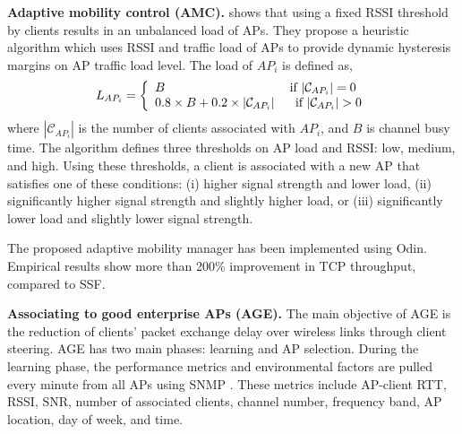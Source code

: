 \textbf{Adaptive mobility control (AMC).} 
\cite{mob-Essex-2016} shows that using a fixed RSSI threshold by clients results in an unbalanced load of APs.
They propose a heuristic algorithm which uses RSSI and traffic load of APs to provide dynamic hysteresis margins on AP traffic load level. 
The load of $AP_{i}$ is defined as,
%
\begin{equation}
\label{eq:eq18}
L_{AP_{i}}=\left\{\begin{array}{ll}
B\textrm{\ \ \ \ \ \ \ \ \ \quad\quad\quad\quad\quad\quad\quad if  $|\mathcal{C}_{AP_{i}}|=0$}\\
0.8\times B +0.2\times |\mathcal{C}_{AP_{i}}| \textrm{\quad\ \  if $|\mathcal{C}_{AP_{i}}|>0$}
\end{array}\right.
\end{equation}
where $|\mathcal{C}_{AP_{i}}|$ is the number of clients associated with $AP_{i}$, and $B$ is channel busy time.
The algorithm defines three thresholds on AP load and RSSI: low, medium, and high.
Using these thresholds, a client is associated with a new AP that satisfies one of these conditions: (i) higher signal strength and lower load, (ii) significantly higher signal strength and slightly higher load, or (iii) significantly lower load and slightly lower signal strength.

The proposed adaptive mobility manager has been implemented using Odin.
Empirical results show more than 200\% improvement in TCP throughput, compared to SSF.





\textbf{Associating to good enterprise APs (AGE).}%
\label{AGE}
The main objective of AGE \cite{WiFiSeer} is the reduction of clients' packet exchange delay over wireless links through client steering.
AGE has two main phases: learning and AP selection. 
During the learning phase, the performance metrics and environmental factors are pulled every minute from all APs using SNMP \cite{SNMP}. 
These metrics include AP-client RTT, RSSI, SNR, number of associated clients, channel number, frequency band, AP location, day of week, and time.

